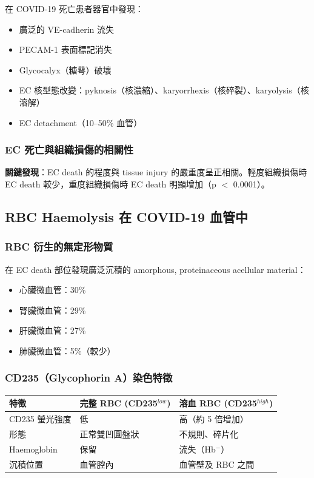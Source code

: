 \documentclass[12pt,a4paper]{article}
\begin{document}
在 COVID-19 死亡患者器官中發現：
\begin{itemize}
    \item 廣泛的 VE-cadherin 流失
    \item PECAM-1 表面標記消失
    \item Glycocalyx（糖萼）破壞
    \item EC 核型態改變：pyknosis（核濃縮）、karyorrhexis（核碎裂）、karyolysis（核溶解）
    \item EC detachment（10--50\% 血管）
\end{itemize}

\subsubsection{EC 死亡與組織損傷的相關性}

\begin{importantbox}
\textbf{關鍵發現}：EC death 的程度與 tissue injury 的嚴重度呈正相關。輕度組織損傷時 EC death 較少，重度組織損傷時 EC death 明顯增加（p $<$ 0.0001）。
\end{importantbox}

\subsection{RBC Haemolysis 在 COVID-19 血管中}

\subsubsection{RBC 衍生的無定形物質}

在 EC death 部位發現廣泛沉積的 amorphous, proteinaceous acellular material：
\begin{itemize}
    \item 心臟微血管：30\%
    \item 腎臟微血管：29\%
    \item 肝臟微血管：27\%
    \item 肺臟微血管：5\%（較少）
\end{itemize}

\subsubsection{CD235（Glycophorin A）染色特徵}

\begin{longtable}{p{4cm}p{5cm}p{5cm}}
\toprule
\textbf{特徵} & \textbf{完整 RBC (CD235$^{low}$)} & \textbf{溶血 RBC (CD235$^{high}$)} \\
\midrule
\endhead
CD235 螢光強度 & 低 & 高（約 5 倍增加） \\
形態 & 正常雙凹圓盤狀 & 不規則、碎片化 \\
Haemoglobin & 保留 & 流失（Hb$^{-}$） \\
沉積位置 & 血管腔內 & 血管壁及 RBC 之間 \\
\bottomrule
\end{longtable}
\end{document}
